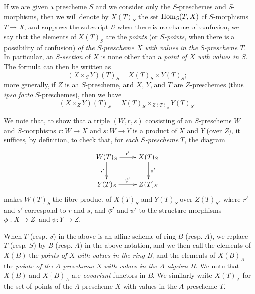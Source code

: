 \begin{env}[3.4.3]
\label{1.3.4.3}
If we are given a prescheme $S$ and we consider only the $S$-preschemes and $S$-morphisms,
then we will denote by $X(T)_S$ the set ${\mathop{\mathrm{Hom}}\nolimits}_S(T,X)$ of $S$-morphisms $T\to X$, and suppress
the subscript $S$ when there is no chance of confusion; we say that the elements of $X(T)_S$
are the \emph{points} (or \emph{$S$-points}, when there is a possibility of confusion)
\emph{of the $S$-prescheme $X$ with values in the $S$-prescheme $T$}. In particular, an
\emph{$S$-section} of $X$ is none other than a \emph{point of $X$ with values in $S$}. The
formula  can then be written as
\begin{equation*}
\label{1.3.4.3.1}
  (X\times_S Y)(T)_S=X(T)_S\times Y(T)_S;
  \tag{3.4.3.1}
\end{equation*}
more generally, if $Z$ is an $S$-prescheme, and $X$, $Y$, and $T$ are $Z$-preschemes (thus
\emph{ipso facto} $S$-preschemes), then we have
\begin{equation*}
\label{1.3.4.3.2}
  (X\times_Z Y)(T)_S=X(T)_S\times_{Z(T)_S}Y(T)_S.
  \tag{3.4.3.2}
\end{equation*}

We note that, to show that a triple $(W,r,s)$ consisting of an $S$-prescheme $W$ and
$S$-morphisms $r:W\to X$ and $s:W\to Y$ is a product of $X$ and $Y$ (over $Z$), it suffices, by
definition, to check that, for \emph{each $S$-prescheme $T$}, the diagram
\[
  \xymatrix{
    W(T)_S\ar[r]^{r'}\ar[d]_{s'} &
    X(T)_S\ar[d]^{\vphi'}\\
    Y(T)_S\ar[r]^{\psi'} &
    Z(T)_S
  }
\]
makes $W(T)_S$ the fibre product of $X(T)_S$ and $Y(T)_S$ over $Z(T)_S$, where $r'$ and $s'$
correspond to $r$ and $s$, and $\phi'$ and $\psi'$ to the structure morphisms $\vphi:X\to Z$ and $\psi:Y\to Z$.
\end{env}

\begin{env}[3.4.4]
\label{1.3.4.4}
When $T$ (resp. $S$) in the above is an affine scheme of ring $B$ (resp. $A$), we replace
$T$ (resp. $S$) by $B$ (resp. $A$) in the above notation, and we then call the elements of
$X(B)$ the \emph{points of $X$ with values in the ring $B$}, and the elements of $X(B)_A$ the
\emph{points of the $A$-prescheme $X$ with values in the $A$-algebra $B$}. We note that
$X(B)$ and $X(B)_A$ are \emph{covariant} functors in $B$. We similarly write $X(T)_A$ for the
set of points of the $A$-prescheme $X$ with values in the $A$-prescheme $T$.
\end{env}

